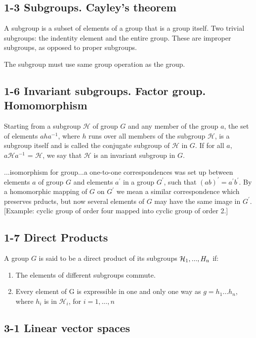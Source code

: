 \documentclass{article}
\begin{document}
\subsection{1-3 Subgroups. Cayley's theorem}

A subgroup is a subset of elements of a group that is a group itself. Two trivial subgroups: the indentity element and the entire group. These are improper subgroups, as opposed to proper subgroups.

The subgroup must use same group operation as the group.

\subsection{1-6 Invariant subgroups. Factor group. Homomorphism}

Starting from a subgroup $\mathcal H$ of group $G$ and any member of the group $a$, the set of elements $aha^{-1}$, where $h$ runs over all members of the subgroup $\mathcal H$, is a subgroup itself and is called the conjugate subgroup of $\mathcal H$ in $G$. If for all $a$, $a{\mathcal H} a^{-1}$ =  $\mathcal H$, we say that $\mathcal H$ is an invariant subgroup in $G$.

...isomorphism for group...a one-to-one correspondences was set up between elements $a$ of group $G$ and elements $a^\prime$ in a group $G^\prime$, such that $(ab)^\prime = a^\prime b^\prime$. By a homomorphic mapping of $G$ on $G^\prime$ we mean a similar correspondence which preserves prducts, but now several elements of $G$ may have the same image in $G^\prime$. [Example: cyclic group of order four mapped into cyclic group of order 2.]

\subsection{1-7 Direct Products}

A group $G$ is said to be a direct product of its subgroups ${\mathcal H_{\rm 1},...,H_{\rm n}}$ if:

\begin{enumerate}
\item The elements of different subgroups commute.
\item Every element of G is expressible in one and only one way as $g = h_1...h_n$, where $h_i$ is in ${\mathcal H}_i$, for $i = 1,...,n$
\end{enumerate}

\subsection{3-1 Linear vector spaces}
\end{document}

